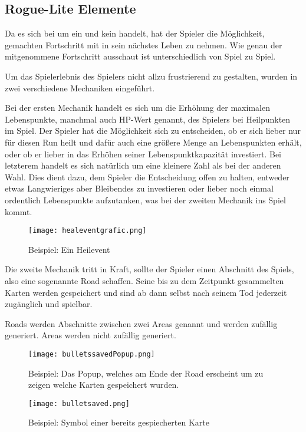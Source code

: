 \subsection{Rogue-Lite Elemente}\label{rogue_lite_elemente}

Da es sich bei \FF um ein  und kein  handelt, hat der Spieler die Möglichkeit, gemachten Fortschritt mit in sein nächstes Leben zu nehmen.
Wie genau der mitgenommene Fortschritt ausschaut ist unterschiedlich von Spiel zu Spiel.


Um das Spielerlebnis des Spielers nicht allzu frustrierend zu gestalten, wurden in \FF zwei verschiedene Mechaniken eingeführt.


Bei der ersten Mechanik handelt es sich um die Erhöhung der maximalen Lebenspunkte, manchmal auch HP-Wert genannt, des Spielers bei Heilpunkten im Spiel.
Der Spieler hat die Möglichkeit sich zu entscheiden, ob er sich lieber nur für diesen Run heilt und dafür auch eine größere Menge an Lebenspunkten erhält, oder ob er
lieber in das Erhöhen seiner Lebenspunktkapazität investiert. Bei letzterem handelt es sich natürlich um eine kleinere Zahl als bei der anderen Wahl.
Dies dient dazu, dem Spieler die Entscheidung offen zu halten, entweder etwas Langwieriges aber Bleibendes zu investieren oder lieber noch einmal ordentlich
Lebenspunkte aufzutanken, was bei der zweiten Mechanik ins Spiel kommt.

\begin{figure}[H]
\texttt{[image: healeventgrafic.png]}
\caption{Beispiel: Ein Heilevent}
\end{figure}


Die zweite Mechanik tritt in Kraft, sollte der Spieler  einen Abschnitt des Spiels, also eine sogenannte Road schaffen. Seine bis zu dem Zeitpunkt gesammelten Karten werden
gespeichert und sind ab dann selbst nach seinem Tod jederzeit zugänglich und spielbar.


Roads werden Abschnitte zwischen zwei Areas genannt und werden zufällig generiert. Areas werden nicht zufällig generiert.

\begin{figure}[H]
    \texttt{[image: bulletssavedPopup.png]}
    \caption{Beispiel: Das Popup, welches am Ende der Road erscheint um zu zeigen welche Karten gespeichert wurden.}
\end{figure}


\begin{figure}[H]
    \texttt{[image: bulletsaved.png]}
    \caption{Beispiel: Symbol einer bereits gespiecherten Karte}
\end{figure}

